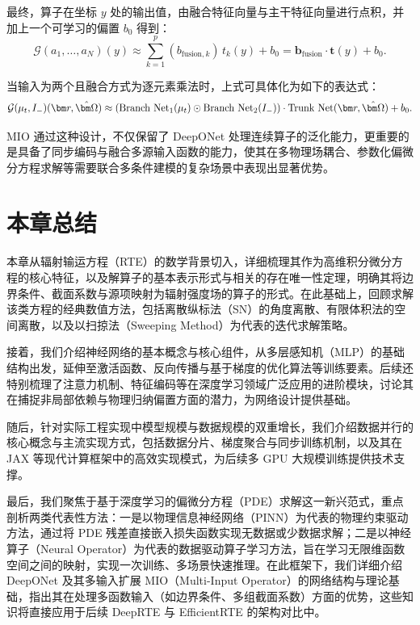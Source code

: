 最终，算子在坐标 $ y $ 处的输出值，由融合特征向量与主干特征向量进行点积，并加上一个可学习的偏置 $ b_0 $ 得到：
\begin{equation}
    \mathcal{G}(a_1, \dots, a_N)(y) \approx \sum_{k=1}^p \left( b_{\text{fusion}, k} \right) \, t_k(y) + b_0 = \mathbf{b}_{\text{fusion}} \cdot \mathbf{t}(y) + b_0.
    \label{eq:miodeeponet}
\end{equation}

当输入为两个且融合方式为逐元素乘法时，上式可具体化为如下的表达式：
\begin{equation*}
    \mathcal{G}(\mut, I_-)(\br, \bOmega) \approx \left( \text{Branch Net}_1(\mut) \odot \text{Branch Net}_2(I_-) \right) \cdot \text{Trunk Net}(\br, \bOmega) + b_0.
\end{equation*}

MIO 通过这种设计，不仅保留了 DeepONet 处理连续算子的泛化能力，更重要的是具备了同步编码与融合多源输入函数的能力，使其在多物理场耦合、参数化偏微分方程求解等需要联合多条件建模的复杂场景中表现出显著优势。

\section{本章总结}

本章从辐射输运方程（RTE）的数学背景切入，详细梳理其作为高维积分微分方程的核心特征，以及解算子的基本表示形式与相关的存在唯一性定理，明确其将边界条件、截面系数与源项映射为辐射强度场的算子的形式。在此基础上，回顾求解该类方程的经典数值方法，包括离散纵标法（SN）的角度离散、有限体积法的空间离散，以及以扫掠法（Sweeping Method）为代表的迭代求解策略。

接着，我们介绍神经网络的基本概念与核心组件，从多层感知机（MLP）的基础结构出发，延伸至激活函数、反向传播与基于梯度的优化算法等训练要素。后续还特别梳理了注意力机制、特征编码等在深度学习领域广泛应用的进阶模块，讨论其在捕捉非局部依赖与物理归纳偏置方面的潜力，为网络设计提供基础。

随后，针对实际工程实现中模型规模与数据规模的双重增长，我们介绍数据并行的核心概念与主流实现方式，包括数据分片、梯度聚合与同步训练机制，以及其在 JAX 等现代计算框架中的高效实现模式，为后续多 GPU 大规模训练提供技术支撑。

最后，我们聚焦于基于深度学习的偏微分方程（PDE）求解这一新兴范式，重点剖析两类代表性方法：一是以物理信息神经网络（PINN）为代表的物理约束驱动方法，通过将 PDE 残差直接嵌入损失函数实现无数据或少数据求解；二是以神经算子（Neural Operator）为代表的数据驱动算子学习方法，旨在学习无限维函数空间之间的映射，实现一次训练、多场景快速推理。在此框架下，我们详细介绍 DeepONet 及其多输入扩展 MIO（Multi-Input Operator）的网络结构与理论基础，指出其在处理多函数输入（如边界条件、多组截面系数）方面的优势，这些知识将直接应用于后续 DeepRTE 与 EfficientRTE 的架构对比中。